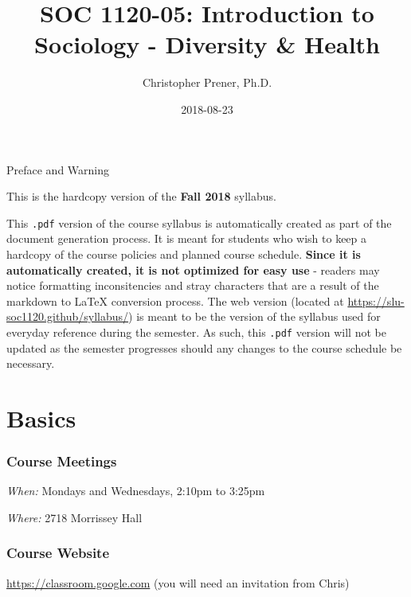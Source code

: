\documentclass[]{book}
\title{SOC 1120-05: Introduction to Sociology - Diversity \& Health}
\author{Christopher Prener, Ph.D.}
\date{2018-08-23}
\theoremstyle{definition}
\theoremstyle{definition}
\theoremstyle{definition}
\theoremstyle{remark}
\begin{document}
\maketitle

\begin{center}
{\huge Preface and Warning} \\
\end{center}
\vspace{5mm}
This is the hardcopy version of the \textbf{Fall 2018} syllabus.
\vspace{5mm}
\par \noindent This \texttt{.pdf} version of the course syllabus is automatically created as part of the document generation process. It is meant for students who wish to keep a hardcopy of the course policies and planned course schedule. \textbf{Since it is automatically created, it is not optimized for easy use} - readers may notice formatting inconsitencies and stray characters that are a result of the markdown to \LaTeX{} conversion process. The web version (located at \href{https://slu-soc1120.github/syllabus/}{https://slu-soc1120.github/syllabus/}) is meant to be the version of the syllabus used for everyday reference during the semester. As such, this \texttt{.pdf} version will not be updated as the semester progresses should any changes to the course schedule be necessary.

\hypertarget{basics}{%
\chapter*{Basics}\label{basics}}

\hypertarget{course-meetings}{%
\subsection*{Course Meetings}\label{course-meetings}}

\emph{When:} Mondays and Wednesdays, 2:10pm to 3:25pm

\emph{Where:} 2718 Morrissey Hall

\hypertarget{course-website}{%
\subsection*{Course Website}\label{course-website}}

\url{https://classroom.google.com} (you will need an invitation from
Chris)
\end{document}

